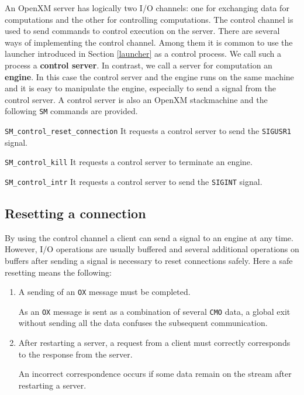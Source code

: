 An OpenXM server has logically two I/O channels: one for exchanging
data for computations and the other for controlling computations. The
control channel is used to send commands to control execution on the
server. There are several ways of implementing the control channel.
Among them it is common to use the launcher introduced in Section
\ref{launcher} as a control process. We call such a process a {\bf
control server}. In contrast, we call a server for computation an {\bf
engine}. In this case the control server and the engine runs on the
same machine and it is easy to manipulate the engine, especially to
send a signal from the control server. A control server is also an
OpenXM stackmachine and the following {\tt SM} commands are provided.

\begin{description}
\item {\tt SM\_control\_reset\_connection}
It requests a control server to send the {\tt SIGUSR1} signal.

\item {\tt SM\_control\_kill}
It requests a control server to terminate an engine.

\item {\tt SM\_control\_intr}
It requests a control server to send the {\tt SIGINT} signal.
\end{description}

\subsection{Resetting a connection}

By using the control channel a client can send a signal to an engine
at any time. However, I/O operations are usually buffered and several
additional operations on buffers after sending a signal is necessary
to reset connections safely. Here a safe resetting means the
following:

\begin{enumerate}
\item A sending of an {\tt OX} message must be completed.

As an {\tt OX} message is sent as a combination of several {\tt CMO}
data, a global exit without sending all the data confuses the
subsequent communication.

\item After restarting a server, a request from a client 
must correctly corresponds to the response from the server.

An incorrect correspondence occurs if some data remain on the stream
after restarting a server.
\end{enumerate}

